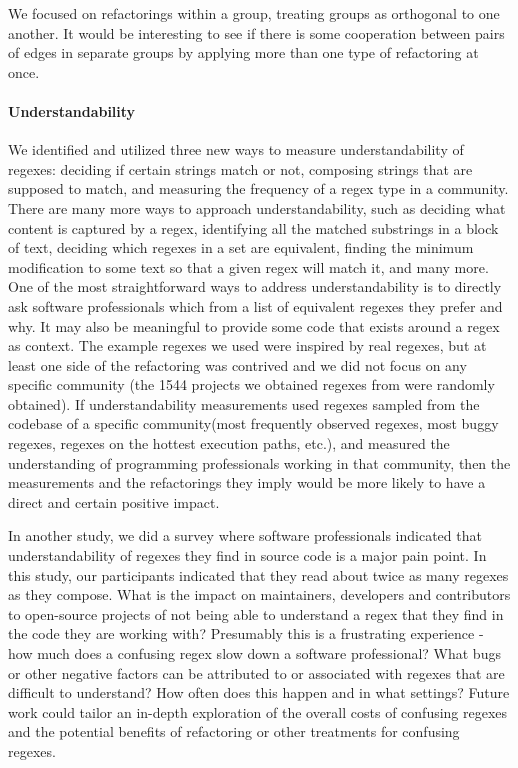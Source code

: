 We focused on refactorings within a group, treating groups as orthogonal to one another.  It would be interesting to see if there is some cooperation between pairs of edges in separate groups by applying more than one type of refactoring at once.

\paragraph{Understandability}
We identified and utilized three new ways to measure understandability of regexes: deciding if certain strings match or not, composing strings that are supposed to match, and measuring the frequency of a regex type in a community.  There are many more ways to approach understandability, such as deciding what content is captured by a regex, identifying all the matched substrings in a block of text, deciding which regexes in a set are equivalent, finding the minimum modification to some text so that a given regex will match it, and many more.  One of the most straightforward ways to address understandability is to directly ask software professionals which from a list of equivalent regexes they prefer and why.  It may also be meaningful to provide some code that exists around a regex as context.  The example regexes we used were inspired by real regexes, but at least one side of the refactoring was contrived and we did not focus on any specific community (the 1544 projects we obtained regexes from were randomly obtained).  If understandability measurements used regexes sampled from the codebase of a specific community(most frequently observed regexes, most buggy regexes, regexes on the hottest execution paths, etc.), and measured the understanding of programming professionals working in that community, then the measurements and the refactorings they imply would be more likely to have a direct and certain positive impact.

In another study, we did a survey where software professionals indicated that understandability of regexes they find in source code is a major pain point.  In this study, our participants indicated that they read about twice as many regexes as they compose.  What is the impact on maintainers, developers and contributors to open-source projects of not being able to understand a regex that they find in the code they are working with?  Presumably this is a frustrating experience - how much does a confusing regex slow down a software professional?  What bugs or other negative factors can be attributed to or associated with regexes that are difficult to understand?  How often does this happen and in what settings?  Future work could tailor an in-depth exploration of the overall costs of confusing regexes and the potential benefits of refactoring or other treatments for confusing regexes.

